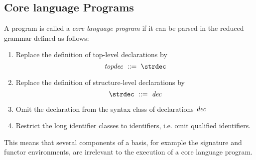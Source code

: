 \subsection*{Core language Programs}
A program is called a {\sl core language program\/} if it can be
parsed in the reduced grammar defined as follows:
\begin{enumerate}
\item Replace the definition of top-level declarations by
\[\topdec\ ::=\ \strdec\]
\item Replace the definition of structure-level declarations by
\[\strdec\ ::=\ \dec\]
\item Omit the {\OPEN} declaration from the syntax class of
declarations ${\it dec}$
\item Restrict the long identifier classes to identifiers, i.e.
omit qualified identifiers.
\end{enumerate}
This means that  several components of a basis, for example the
signature and functor environments, are irrelevant to the execution
of a core language program.